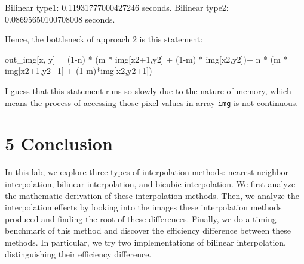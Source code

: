 \documentclass[
]{article}
\newenvironment{Shaded}{}{}
\newcommand{\DecValTok}[1]{\textcolor[rgb]{0.25,0.63,0.44}{#1}}
\newcommand{\FloatTok}[1]{\textcolor[rgb]{0.25,0.63,0.44}{#1}}
\newcommand{\NormalTok}[1]{#1}
\newcommand{\OperatorTok}[1]{\textcolor[rgb]{0.40,0.40,0.40}{#1}}
\begin{document}
\begin{Shaded}
\begin{Highlighting}[]
\NormalTok{Bilinear type1: }\FloatTok{0.11931777000427246}\NormalTok{ seconds.}
\NormalTok{Bilinear type2: }\FloatTok{0.08695650100708008}\NormalTok{ seconds.}
\end{Highlighting}
\end{Shaded}

Hence, the bottleneck of approach 2 is this statement:

\begin{Shaded}
\begin{Highlighting}[]
\NormalTok{out\_img[x, y] }\OperatorTok{=}\NormalTok{ (}\DecValTok{1}\OperatorTok{{-}}\NormalTok{n) }\OperatorTok{*}\NormalTok{ (m }\OperatorTok{*}\NormalTok{ img[x2}\OperatorTok{+}\DecValTok{1}\NormalTok{,y2] }\OperatorTok{+}\NormalTok{ (}\DecValTok{1}\OperatorTok{{-}}\NormalTok{m) }\OperatorTok{*}\NormalTok{ img[x2,y2])}\OperatorTok{+}\NormalTok{ n }\OperatorTok{*}\NormalTok{ (m }\OperatorTok{*}\NormalTok{ img[x2}\OperatorTok{+}\DecValTok{1}\NormalTok{,y2}\OperatorTok{+}\DecValTok{1}\NormalTok{] }\OperatorTok{+}\NormalTok{ (}\DecValTok{1}\OperatorTok{{-}}\NormalTok{m)}\OperatorTok{*}\NormalTok{img[x2,y2}\OperatorTok{+}\DecValTok{1}\NormalTok{])}
\end{Highlighting}
\end{Shaded}

I guess that this statement runs so slowly due to the nature of memory,
which means the process of accessing those pixel values in array
\texttt{img} is not continuous.

\hypertarget{5-conclusion}{%
\section{5 Conclusion}\label{5-conclusion}}

In this lab, we explore three types of interpolation methods: nearest
neighbor interpolation, bilinear interpolation, and bicubic
interpolation. We first analyze the mathematic derivation of these
interpolation methods. Then, we analyze the interpolation effects by
looking into the images these interpolation methods produced and finding
the root of these differences. Finally, we do a timing benchmark of this
method and discover the efficiency difference between these methods. In
particular, we try two implementations of bilinear interpolation,
distinguishing their efficiency difference.
\end{document}

